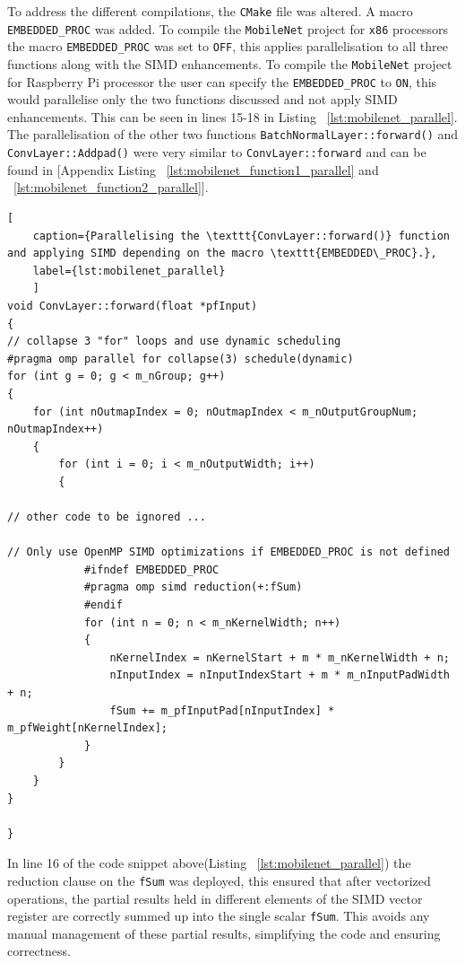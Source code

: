 To address the different compilations, the \texttt{CMake} file was altered. A macro \texttt{EMBEDDED\_PROC} was added. To compile the \texttt{MobileNet} project for \texttt{x86} processors the macro \texttt{EMBEDDED\_PROC} was set to \texttt{OFF}, this applies parallelisation to all three functions along with the SIMD enhancements. To compile the \texttt{MobileNet} project for Raspberry Pi processor the user can specify the \texttt{EMBEDDED\_PROC} to \texttt{ON}, this would parallelise only the two functions discussed and not apply SIMD enhancements. This can be seen in lines 15-18 in Listing ~\ref{lst:mobilenet_parallel}. The parallelisation of the other two functions \texttt{BatchNormalLayer::forward()} and \texttt{ConvLayer::Addpad()} were very similar to \texttt{ConvLayer::forward} and can be found in [Appendix Listing ~\ref{lst:mobilenet_function1_parallel} and ~\ref{lst:mobilenet_function2_parallel}]. 

\begin{lstlisting}[
	caption={Parallelising the \texttt{ConvLayer::forward()} function and applying SIMD depending on the macro \texttt{EMBEDDED\_PROC}.},
	label={lst:mobilenet_parallel}
	]
void ConvLayer::forward(float *pfInput)
{
// collapse 3 "for" loops and use dynamic scheduling 
#pragma omp parallel for collapse(3) schedule(dynamic)
for (int g = 0; g < m_nGroup; g++)
{
	for (int nOutmapIndex = 0; nOutmapIndex < m_nOutputGroupNum; nOutmapIndex++)
	{
		for (int i = 0; i < m_nOutputWidth; i++)
		{
			
// other code to be ignored ... 
			
// Only use OpenMP SIMD optimizations if EMBEDDED_PROC is not defined 
			#ifndef EMBEDDED_PROC
			#pragma omp simd reduction(+:fSum)
			#endif
			for (int n = 0; n < m_nKernelWidth; n++)
			{
				nKernelIndex = nKernelStart + m * m_nKernelWidth + n;
				nInputIndex = nInputIndexStart + m * m_nInputPadWidth + n;
				fSum += m_pfInputPad[nInputIndex] * m_pfWeight[nKernelIndex];
			}
		}
	}              
}

}
\end{lstlisting}

In line 16 of the code snippet above(Listing ~\ref{lst:mobilenet_parallel}) the reduction clause on the \texttt{fSum} was deployed, this ensured that after vectorized operations, the partial results held in different elements of the SIMD vector register are correctly summed up into the single scalar \texttt{fSum}. This avoids any manual management of these partial results, simplifying the code and ensuring correctness.

